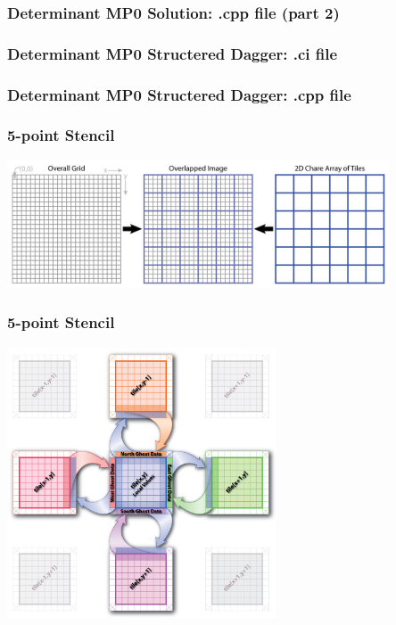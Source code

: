 \documentclass{beamer}
\begin{document}
\begin{frame}[fragile]
  \frametitle{Determinant MP0 Solution: .cpp file (part 2)}
  
\end{frame}

\begin{frame}[fragile]
  \frametitle{Determinant MP0 Structered Dagger: .ci file}
  
\end{frame}

\begin{frame}[fragile]
  \frametitle{Determinant MP0 Structered Dagger: .cpp file}
  
\end{frame}

\begin{frame}[fragile]
  \frametitle{5-point Stencil}
   \begin{center} \includegraphics[width=0.85\textwidth]{diagrams/2DJacobi_Decomposition.jpg} \end{center}
\end{frame}

\begin{frame}[fragile]
  \frametitle{5-point Stencil}
   \begin{center} \includegraphics[width=0.6\textwidth]{diagrams/2DJacobi_NeighborComm.jpg} \end{center}
\end{frame}
\end{document}
